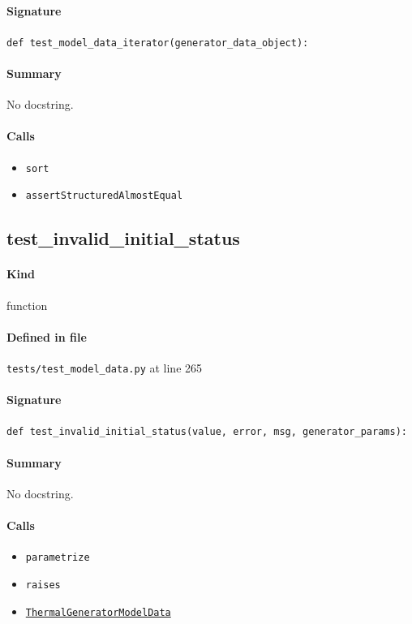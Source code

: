 \documentclass[11pt]{report}
\begin{document}
\paragraph{Signature} \texttt{def test\_model\_data\_iterator(generator\_data\_object):}
\paragraph{Summary} No docstring.
\paragraph{Calls}
\begin{itemize}[leftmargin=*]
  \item \texttt{sort}
  \item \texttt{assertStructuredAlmostEqual}
\end{itemize}
\subsection{test\_invalid\_initial\_status}
\label{def:tests-test_model_data.py:test_invalid_initial_status:L265}
\paragraph{Kind} function
\paragraph{Defined in file} \texttt{tests/test\_model\_data.py} at line 265
\paragraph{Signature} \texttt{def test\_invalid\_initial\_status(value, error, msg, generator\_params):}
\paragraph{Summary} No docstring.
\paragraph{Calls}
\begin{itemize}[leftmargin=*]
  \item \texttt{parametrize}
  \item \texttt{raises}
  \item \hyperref[def:model_data.py:ThermalGeneratorModelData:L185]{\texttt{ThermalGeneratorModelData}}
\end{itemize}
\end{document}
